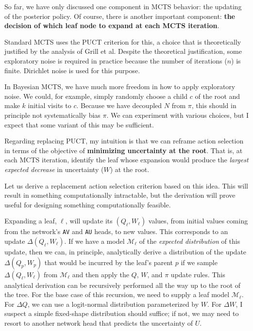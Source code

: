 \documentclass[tikz]{article}
\begin{document}
So far, we have only discussed one component in MCTS behavior: the updating of the posterior policy. Of course, there is another
important component: \textbf{the decision of which leaf node to expand at each MCTS iteration}. \newline

Standard MCTS uses the PUCT criterion for this, a choice that is theoretically justified by the analysis of Grill et al. Despite the
theoretical justification, some exploratory noise is required in practice because the number of iterations ($n$) is finite. Dirichlet
noise is used for this purpose. \newline

In Bayesian MCTS, we have much more freedom in how to apply exploratory noise. We could, for example, simply randomly choose a child $c$ of
the root and make $k$ initial visits to $c$. Because we have decoupled $N$ from $\pi$, this should in principle not systematically bias $\pi$. We can
experiment with various choices, but I expect that some variant of this may be sufficient.\newline

Regarding replacing PUCT, my intuition is that we can reframe action selection in terms of the objective of \textbf{minimizing uncertainty at the root}.
That is, at each MCTS iteration, identify the leaf whose expansion would produce the \textit{largest expected decrease} in uncertainty ($W$) at the root. \newline

Let us derive a replacement action selection criterion based on this idea. This will result in something
computationally intractable, but the derivation will prove useful for designing something computationally feasible. \newline

Expanding a leaf, $\ell$, will update its $(Q_\ell, W_\ell)$ values, 
from initial values coming from the network's \texttt{AV} and \texttt{AU} heads, to new values. 
This corresponds to an update $\Delta (Q_\ell, W_\ell)$.
If we have a model $\mathcal{M}_\ell$ of the \textit{expected distribution} of this update,
then we can, in principle, analytically derive a distribution of the update $\Delta(Q_p, W_p)$ that would be incurred by the leaf's parent $p$ 
if we sample $\Delta (Q_\ell, W_\ell)$ from $\mathcal{M}_\ell$ and then apply the $Q$, $W$, and $\pi$ update rules.
This analytical derivation can be recursively performed all the way up to the root of the tree. For the base
case of this recursion, we need to supply a leaf model $\mathcal{M}_\ell$. For $\Delta Q$, we can
use a logit-normal distribution parameterized by $W$. For $\Delta W$, I suspect a simple fixed-shape distribution
should suffice; if not, we may need to resort to another network head that predicts the uncertainty of $U$. \newline
\end{document}
